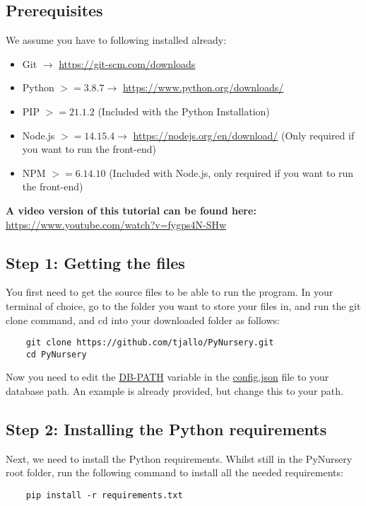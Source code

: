 \documentclass{article}
\begin{document}
\subsection{Prerequisites}
We assume you have to following installed already:
\begin{itemize}
    \item Git $\rightarrow$  \url{https://git-scm.com/downloads}
    \item Python $>= 3.8.7 \rightarrow$ \url{https://www.python.org/downloads/}
    \item PIP $>=21.1.2$ (Included with the Python Installation)
    \item Node.js $>= 14.15.4 \rightarrow$ \url{https://nodejs.org/en/download/} (Only required if you want to run the front-end)
    \item NPM $>= 6.14.10$ (Included with Node.js, only required if you want to run the front-end)
\end{itemize}
\textbf{A video version of this tutorial can be found here: }\\
\url{https://www.youtube.com/watch?v=fygps4N-SHw}

\subsection{Step 1: Getting the files}
You first need to get the source files to be able to run the program. In your terminal of choice, go to the folder you want to store your files in, and run the git clone command, and cd into your downloaded folder as follows:
\begin{verbatim}
    git clone https://github.com/tjallo/PyNursery.git
    cd PyNursery
\end{verbatim}
Now you need to edit the \url{DB-PATH} variable in the \url{config.json} file to your database path. An example is already provided, but change this to your path.

\subsection{Step 2: Installing the Python requirements}
Next, we need to install the Python requirements. Whilst still in the PyNursery root folder, run the following command to install all the needed requirements:
\begin{verbatim}
    pip install -r requirements.txt
\end{verbatim}
\end{document}
